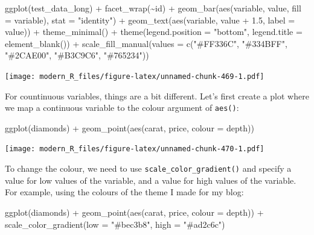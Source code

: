 \documentclass[
]{article}
\newenvironment{Shaded}{\begin{snugshade}}{\end{snugshade}}
\newcommand{\AttributeTok}[1]{\textcolor[rgb]{0.77,0.63,0.00}{#1}}
\newcommand{\FloatTok}[1]{\textcolor[rgb]{0.00,0.00,0.81}{#1}}
\newcommand{\FunctionTok}[1]{\textcolor[rgb]{0.00,0.00,0.00}{#1}}
\newcommand{\NormalTok}[1]{#1}
\newcommand{\SpecialCharTok}[1]{\textcolor[rgb]{0.00,0.00,0.00}{#1}}
\newcommand{\StringTok}[1]{\textcolor[rgb]{0.31,0.60,0.02}{#1}}
\begin{document}
\begin{Shaded}
\begin{Highlighting}[]
\FunctionTok{ggplot}\NormalTok{(test\_data\_long) }\SpecialCharTok{+}
  \FunctionTok{facet\_wrap}\NormalTok{(}\SpecialCharTok{\textasciitilde{}}\NormalTok{id) }\SpecialCharTok{+}
  \FunctionTok{geom\_bar}\NormalTok{(}\FunctionTok{aes}\NormalTok{(variable, value, }\AttributeTok{fill =}\NormalTok{ variable), }\AttributeTok{stat =} \StringTok{"identity"}\NormalTok{) }\SpecialCharTok{+}
  \FunctionTok{geom\_text}\NormalTok{(}\FunctionTok{aes}\NormalTok{(variable, value }\SpecialCharTok{+} \FloatTok{1.5}\NormalTok{, }\AttributeTok{label =}\NormalTok{ value)) }\SpecialCharTok{+}
  \FunctionTok{theme\_minimal}\NormalTok{() }\SpecialCharTok{+}
  \FunctionTok{theme}\NormalTok{(}\AttributeTok{legend.position =} \StringTok{"bottom"}\NormalTok{, }\AttributeTok{legend.title =} \FunctionTok{element\_blank}\NormalTok{()) }\SpecialCharTok{+}
  \FunctionTok{scale\_fill\_manual}\NormalTok{(}\AttributeTok{values =} \FunctionTok{c}\NormalTok{(}\StringTok{"\#FF336C"}\NormalTok{, }\StringTok{"\#334BFF"}\NormalTok{, }\StringTok{"\#2CAE00"}\NormalTok{, }\StringTok{"\#B3C9C6"}\NormalTok{, }\StringTok{"\#765234"}\NormalTok{))}
\end{Highlighting}
\end{Shaded}

\texttt{[image: modern\_R\_files/figure-latex/unnamed-chunk-469-1.pdf]}

For countinuous variables, things are a bit different. Let's first create a plot where we map a continuous
variable to the colour argument of \texttt{aes()}:

\begin{Shaded}
\begin{Highlighting}[]
\FunctionTok{ggplot}\NormalTok{(diamonds) }\SpecialCharTok{+}
  \FunctionTok{geom\_point}\NormalTok{(}\FunctionTok{aes}\NormalTok{(carat, price, }\AttributeTok{colour =}\NormalTok{ depth))}
\end{Highlighting}
\end{Shaded}

\texttt{[image: modern\_R\_files/figure-latex/unnamed-chunk-470-1.pdf]}

To change the colour, we need to use \texttt{scale\_color\_gradient()} and specify a value for low values of the variable,
and a value for high values of the variable. For example, using the colours of the theme I made for my blog:

\begin{Shaded}
\begin{Highlighting}[]
\FunctionTok{ggplot}\NormalTok{(diamonds) }\SpecialCharTok{+}
  \FunctionTok{geom\_point}\NormalTok{(}\FunctionTok{aes}\NormalTok{(carat, price, }\AttributeTok{colour =}\NormalTok{ depth)) }\SpecialCharTok{+}
  \FunctionTok{scale\_color\_gradient}\NormalTok{(}\AttributeTok{low =} \StringTok{"\#bec3b8"}\NormalTok{, }\AttributeTok{high =} \StringTok{"\#ad2c6c"}\NormalTok{)}
\end{Highlighting}
\end{Shaded}
\end{document}
